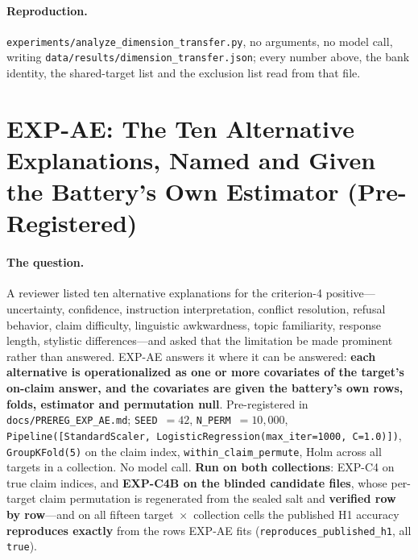 \paragraph{Reproduction.} \texttt{experiments/analyze\_dimension\_transfer.py}, no arguments, no model call, writing \texttt{data/results/dimension\_transfer.json}; every number above, the bank identity, the shared-target list and the exclusion list read from that file.

\section{EXP-AE: The Ten Alternative Explanations, Named and Given the Battery's Own Estimator (Pre-Registered)}
\label{app:covariate_audit}

\paragraph{The question.} A reviewer listed ten alternative explanations for the criterion-4 positive---uncertainty, confidence, instruction interpretation, conflict resolution, refusal behavior, claim difficulty, linguistic awkwardness, topic familiarity, response length, stylistic differences---and asked that the limitation be made prominent rather than answered. EXP-AE answers it where it can be answered: \textbf{each alternative is operationalized as one or more covariates of the target's on-claim answer, and the covariates are given the battery's own rows, folds, estimator and permutation null}. Pre-registered in \texttt{docs/PREREG\_EXP\_AE.md}; \texttt{SEED}~$=42$, \texttt{N\_PERM}~$=10{,}000$, \texttt{Pipeline([StandardScaler, LogisticRegression(max\_iter=1000, C=1.0)])}, \texttt{GroupKFold(5)} on the claim index, \texttt{within\_claim\_permute}, Holm across all targets in a collection. No model call. \textbf{Run on both collections}: EXP-C4 on true claim indices, and \textbf{EXP-C4B on the blinded candidate files}, whose per-target claim permutation is regenerated from the sealed salt and \textbf{verified row by row}---and on all fifteen target~$\times$~collection cells the published H1 accuracy \textbf{reproduces exactly} from the rows EXP-AE fits (\texttt{reproduces\_published\_h1}, all \texttt{true}).

